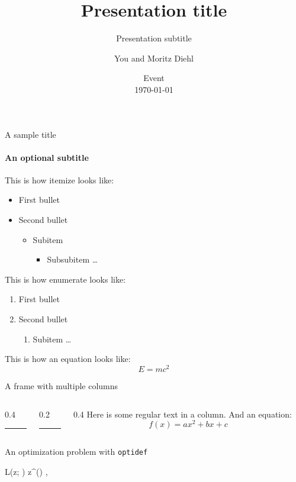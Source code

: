 \documentclass[10pt,aspectratio=1610]{beamer} %
\title[Presentation title in footnote]{\huge Presentation title}
\subtitle{\large Presentation subtitle}
\author[You and M. Diehl]{You and Moritz Diehl}
\institute{Systems Control and Optimization Laboratory (syscop)}
\date[\today]{Event \\ \today }
\begin{document}
\InsertTitle



\begin{frame}{A sample title}
	\framesubtitle{An optional subtitle}

	This is how itemize looks like:
	\begin{itemize}
		\item First bullet
		\item Second bullet
		\begin{itemize}
			\item Subitem
			\begin{itemize}
				\item Subsubitem \ldots
			\end{itemize}
		\end{itemize}
	\end{itemize}

	This is how enumerate looks like:
	\begin{enumerate}
		\item First bullet
		\item Second bullet
		\begin{enumerate}
			\item Subitem \ldots
		\end{enumerate}
	\end{enumerate}

	This is how an equation looks like:
	\begin{equation}
		E = mc^2
	\end{equation}
\end{frame}

\begin{frame}{A frame with multiple columns}
	\begin{columns} [onlytextwidth]
		\begin{column}{0.4\textwidth}
			\centering
			\rule{100pt}{150pt} %
		\end{column}
		\begin{column}{0.2\textwidth}
			\centering
			\rule{40pt}{150pt} %
		\end{column}
		\begin{column}{0.4\textwidth}
			Here is some regular text in a column. And an equation:
			\[
			f(x)=ax^2+bx+c
			\]
		\end{column}
	\end{columns}
\end{frame}

\begin{frame}{An optimization problem with \texttt{optidef}}
	\begin{argmini}
		{}
		{L(z; \theta) \label{eq:z_star_def}}
		{}
		{z^\star(\theta) \coloneqq}
		,
	\end{argmini}
\end{frame}



\end{document}
